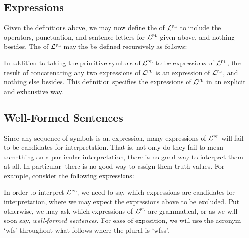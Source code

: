 \subsection{Expressions}%
  \label{sub:expressions}

Given the definitions above, we may now define the  of $\mathcal{L}^{\textsc{pl}}$ to include the operators, punctuation, and sentence letters for $\mathcal{L}^{\textsc{pl}}$ given above, and nothing besides.
The  of $\mathcal{L}^{\textsc{pl}}$ may the be defined recursively as follows: 
  

In addition to taking the primitive symbols of $\mathcal{L}^{\textsc{pl}}$ to be expressions of $\mathcal{L}^{\textsc{pl}}$, the result of concatenating any two expressions of $\mathcal{L}^{\textsc{pl}}$ is an expression of $\mathcal{L}^{\textsc{pl}}$, and nothing else besides.
This definition specifies the expressions of $\mathcal{L}^{\textsc{pl}}$ in an explicit and exhaustive way.





\subsection{Well-Formed Sentences}
  \label{sub:wfs}

Since any sequence of symbols is an expression, many expressions of $\mathcal{L}^{\textsc{pl}}$ will fail to be candidates for interpretation.
That is, not only do they fail to mean something on a particular interpretation, there is no good way to interpret them at all.
In particular, there is no good way to assign them truth-values.
For example, consider the following expressions:

\begin{earg}
  \eitem{\enot\enot\enot\enot}
  \eitem{))\eiff}
\end{earg}

In order to interpret $\mathcal{L}^{\textsc{pl}}$, we need to say which expressions are candidates for interpretation, where we may expect the expressions above to be excluded.
Put otherwise, we may ask which expressions of $\mathcal{L}^{\textsc{pl}}$ are grammatical, or as we will soon say, \textit{well-formed sentences}.
For ease of exposition, we will use the acronym `wfs' throughout what follows where the plural is `wfss'.

